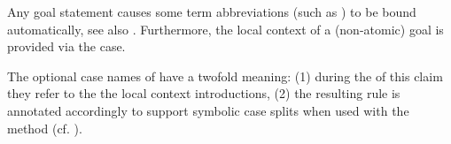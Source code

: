 \begin{isabellebody}
\begin{isamarkuptext}
\begin{descr}
  \end{descr}

  Any goal statement causes some term abbreviations (such as
  \mbox{}) to be bound automatically, see also
  .  Furthermore, the local context of a
  (non-atomic) goal is provided via the \mbox{} case.

  The optional case names of \mbox{} have a twofold
  meaning: (1) during the of this claim they refer to the the local
  context introductions, (2) the resulting rule is annotated
  accordingly to support symbolic case splits when used with the
  \mbox{} method (cf.  ).

  \medskip


\end{isamarkuptext}
\end{isabellebody}
